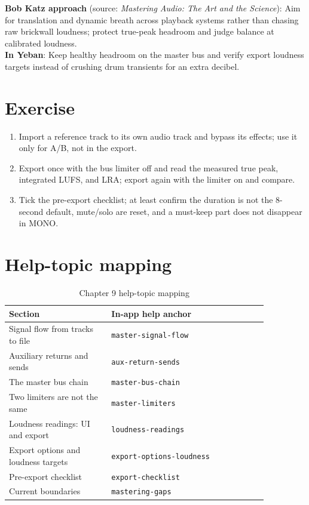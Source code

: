 \begin{tipbox}
\textbf{Bob Katz approach} (source: \emph{Mastering Audio: The Art and the Science}): Aim for translation and dynamic breath across playback systems rather than chasing raw brickwall loudness; protect true-peak headroom and judge balance at calibrated loudness.\\
\textbf{In Yeban}: Keep healthy headroom on the master bus and verify export loudness targets instead of crushing drum transients for an extra decibel.
\end{tipbox}

\section{Exercise}


\begin{exercise}
\begin{enumerate}
  \item Import a reference track to its own audio track and bypass its effects; use it only for A/B, not in the export.
  \item Export once with the bus limiter off and read the measured true peak, integrated LUFS, and LRA; export again with the limiter on and compare.
  \item Tick the pre-export checklist; at least confirm the duration is not the 8-second default, mute/solo are reset, and a must-keep part does not disappear in MONO.
\end{enumerate}
\end{exercise}

\section{Help-topic mapping}

\begin{table}[htbp]
\centering
\small
\begin{tabular}{@{}p{0.34\linewidth}p{0.52\linewidth}@{}}
\hline
Section & In-app help anchor \\
\hline
Signal flow from tracks to file & \texttt{master-signal-flow} \\
Auxiliary returns and sends & \texttt{aux-return-sends} \\
The master bus chain & \texttt{master-bus-chain} \\
Two limiters are not the same & \texttt{master-limiters} \\
Loudness readings: UI and export & \texttt{loudness-readings} \\
Export options and loudness targets & \texttt{export-options-loudness} \\
Pre-export checklist & \texttt{export-checklist} \\
Current boundaries & \texttt{mastering-gaps} \\
\hline
\end{tabular}
\caption{Chapter 9 help-topic mapping}
\label{tab:mastering-help-map}
\end{table}

